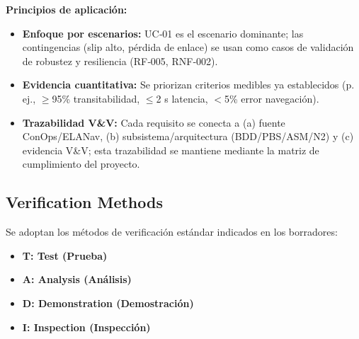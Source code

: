 \textbf{Principios de aplicación:}
\begin{itemize}
    \item \textbf{Enfoque por escenarios:} UC‑01 es el escenario dominante; las contingencias (slip alto, pérdida de enlace) se usan como casos de validación de robustez y resiliencia (RF‑005, RNF‑002). \cite{segoldmine_ppi, nasa_cm, omg_sysml_mbse}  
    \item \textbf{Evidencia cuantitativa:} Se priorizan criterios medibles ya establecidos (p. ej., $\ge$95\% transitabilidad, $\le$2 s latencia, $<$5\% error navegación). \cite{nasa_cm, segoldmine_ppi, omg_sysml_mbse}  
    \item \textbf{Trazabilidad V\&V:} Cada requisito se conecta a (a) fuente ConOps/ELANav, (b) subsistema/arquitectura (BDD/PBS/ASM/N2) y (c) evidencia V\&V; esta trazabilidad se mantiene mediante la matriz de cumplimiento del proyecto. \cite{nasa_cm, segoldmine_ppi, omg_sysml_mbse}
\end{itemize}

\subsection{Verification Methods}

Se adoptan los métodos de verificación estándar indicados en los borradores:
\begin{itemize}
    \item \textbf{T: Test (Prueba)}
    \item \textbf{A: Analysis (Análisis)}
    \item \textbf{D: Demonstration (Demostración)}
    \item \textbf{I: Inspection (Inspección)} \cite{omg_sysml_mbse, nasa_cm, segoldmine_ppi}  
\end{itemize}

